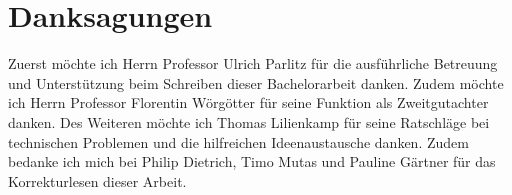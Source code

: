 \chapter{Danksagungen}
Zuerst möchte ich Herrn Professor Ulrich Parlitz für die ausführliche Betreuung und Unterstützung beim Schreiben dieser Bachelorarbeit danken. Zudem möchte ich Herrn Professor Florentin Wörgötter für seine Funktion als Zweitgutachter danken. Des Weiteren möchte ich Thomas Lilienkamp für seine Ratschläge bei technischen Problemen und die hilfreichen Ideenaustausche danken. Zudem bedanke ich mich bei Philip Dietrich, Timo Mutas und Pauline Gärtner für das Korrekturlesen dieser Arbeit. 